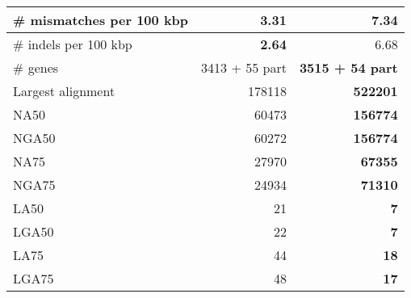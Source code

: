 \documentclass[12pt,a4paper]{article}
\begin{document}
\begin{table}[ht]
\begin{center}
\begin{tabular}{|l*{2}{|r}|}
\# mismatches per 100 kbp & {\bf 3.31} & 7.34 \\ \hline
\# indels per 100 kbp & {\bf 2.64} & 6.68 \\ \hline
\# genes & 3413 + 55 part & {\bf 3515 + 54 part} \\ \hline
Largest alignment & 178118 & {\bf 522201} \\ \hline
NA50 & 60473 & {\bf 156774} \\ \hline
NGA50 & 60272 & {\bf 156774} \\ \hline
NA75 & 27970 & {\bf 67355} \\ \hline
NGA75 & 24934 & {\bf 71310} \\ \hline
LA50 & 21 & {\bf 7} \\ \hline
LGA50 & 22 & {\bf 7} \\ \hline
LA75 & 44 & {\bf 18} \\ \hline
LGA75 & 48 & {\bf 17} \\ \hline
\end{tabular}
\end{center}
\end{table}
\end{document}
